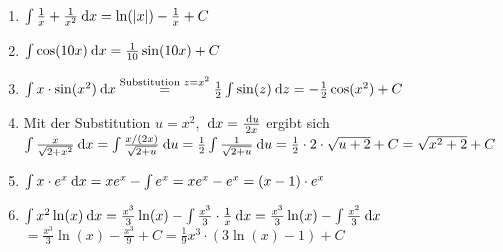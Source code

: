 \item

\begin{enumerate}

\item $\int \frac{1}{x} + \frac{1}{x^2}\:\mathrm{d}{x} = \ln(|x|)-\frac{1}{x}+C$

\item $\int \cos(10x)\:\mathrm{d}{x} = \frac{1}{10}\sin(10x) + C$

\item $\int x\cdot \sin(x^2)\:\mathrm{d}{x} \stackrel{\text{Substitution } z=x^2}{=} \frac{1}{2}\int \sin(z)\:\mathrm{d}{z} = -\frac{1}{2}\cos(x^2)+C$

\item Mit der Substitution $u=x^2$, $\:\mathrm{d}{x} = \frac{\:\mathrm{d}{u}}{2x}$ ergibt sich \\
$\int \frac{x}{\sqrt{2+x^2}} \:\mathrm{d}{x} = \int \frac{x/(2x)}{\sqrt{2+u}} \:\mathrm{d}{u} = \frac{1}{2} \int \frac{1}{\sqrt{2+u}} \:\mathrm{d}{u} = \frac{1}{2} \cdot 2 \cdot \sqrt{u+2} + C = \sqrt{x^2+2} + C$

\item $\int x \cdot e^x \:\mathrm{d}{x} = x e^x - \int e^x = x e^x - e^x = (x-1)\cdot e^x$

\item $\int x^2 \ln(x) \:\mathrm{d}{x} = \frac{x^3}{3}\ln(x) - \int \frac{x^3}{3}\cdot \frac{1}{x} \:\mathrm{d}{x} = \frac{x^3}{3}\ln(x) - \int \frac{x^2}{3} \:\mathrm{d}{x}$ \\
$ = \frac{x^3}{3}\ln(x) - \frac{x^3}{9} + C = \frac{1}{9}x^3 \cdot (3\ln(x)-1) + C$

\end{enumerate}

